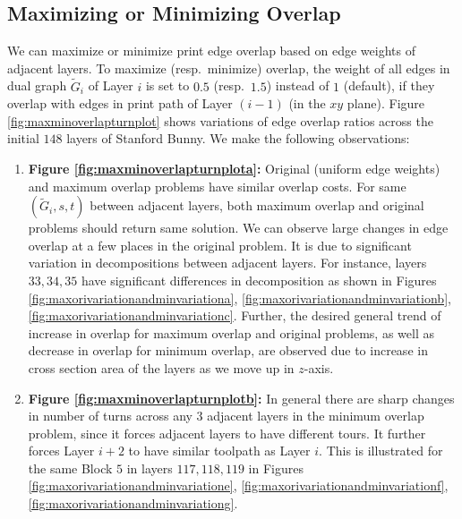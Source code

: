 \subsection{Maximizing or Minimizing Overlap} \label{ssec:maxminovlp}
We can maximize or minimize print edge overlap based on edge weights of adjacent layers.
To maximize (resp.~minimize) overlap, the weight of all edges in dual graph $\tilde{G}_i$ of Layer $i$ is set to $0.5$ (resp.~$1.5$) instead of $1$ (default), if they overlap with edges in print path of Layer $(i-1)$ (in the $xy$ plane).
Figure \ref{fig:maxminoverlapturnplot} shows variations of edge overlap ratios across the initial $148$ layers of Stanford Bunny. 
We make the following observations:
\begin{enumerate}
  \item\label{itm:maxminoverlapa}
    {\bfseries Figure \ref{fig:maxminoverlapturnplota}:}
    Original (uniform edge weights) and maximum overlap problems have similar overlap costs.
    For same $(\tilde{G}_i, s, t)$ between adjacent layers, both maximum overlap and original problems should return same solution.
    We can observe large changes in edge overlap at a few places in the original problem.
    It is due to significant variation in decompositions between adjacent layers.
    For instance, layers $33, 34, 35$ have significant differences in decomposition as shown in Figures \ref{fig:maxorivariationandminvariationa}, \ref{fig:maxorivariationandminvariationb}, \ref{fig:maxorivariationandminvariationc}.
    Further, the desired general trend of increase in overlap for maximum overlap and original problems, as well as decrease in overlap for minimum overlap, are observed due to increase in cross section area of the layers as we move up in $z$-axis.    

  \item\label{itm:maxminoverlapb}
    {\bf Figure \ref{fig:maxminoverlapturnplotb}:}
    In general there are sharp changes in number of turns across any $3$ adjacent layers in the minimum overlap problem, since it forces adjacent layers to have different tours.
    It further forces Layer $i+2$ to have similar toolpath as Layer $i$.
    This is illustrated for the same Block $5$ in layers $117, 118, 119$ in Figures \ref{fig:maxorivariationandminvariatione}, \ref{fig:maxorivariationandminvariationf}, \ref{fig:maxorivariationandminvariationg}. 
\end{enumerate}


